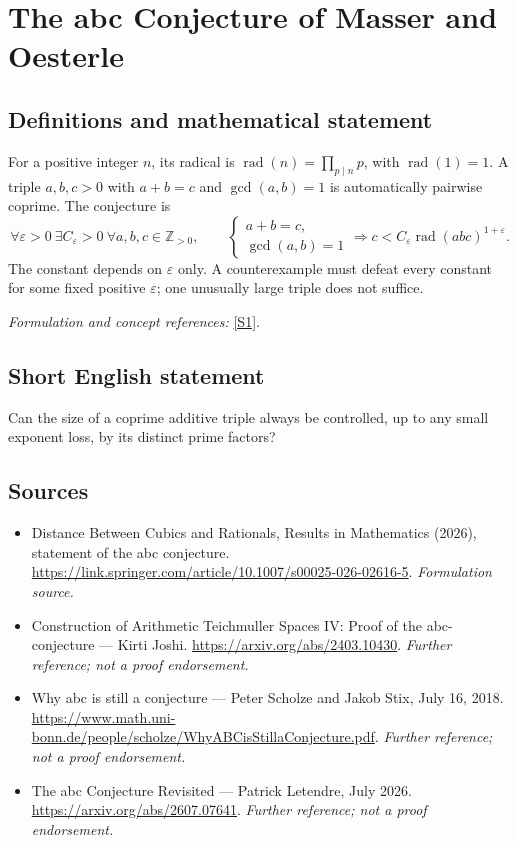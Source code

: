 \documentclass[11pt]{article}
\begin{document}
\section*{\texorpdfstring{The abc Conjecture of Masser and Oesterle}{The abc Conjecture of Masser and Oesterle}}\label{11}
\subsection{Definitions and mathematical statement}
For a positive integer $n$, its radical is $\operatorname{rad}(n)=\prod_{p\mid n}p$, with $\operatorname{rad}(1)=1$. A triple $a,b,c>0$ with $a+b=c$ and $\gcd(a,b)=1$ is automatically pairwise coprime. The conjecture is
\[
 \forall\varepsilon>0\ \exists C_\varepsilon>0\ \forall a,b,c\in{\mathbb{Z}}_{>0},\qquad
 \begin{cases}a+b=c,\\\gcd(a,b)=1\end{cases}
 \Longrightarrow c<C_\varepsilon\operatorname{rad}(abc)^{1+\varepsilon}.
\]
The constant depends on $\varepsilon$ only. A counterexample must defeat every constant for some fixed positive $\varepsilon$; one unusually large triple does not suffice.
\par\smallskip\textit{Formulation and concept references:} \href{https://link.springer.com/article/10.1007/s00025-026-02616-5}{[S1]}.

\subsection{Short English statement}
Can the size of a coprime additive triple always be controlled, up to any small exponent loss, by its distinct prime factors?
\subsection{Sources}
\begin{itemize}
\item[S1]Distance Between Cubics and Rationals, Results in Mathematics (2026), statement of the abc conjecture.
\url{https://link.springer.com/article/10.1007/s00025-026-02616-5}.
\textit{Formulation source.}
\item[S2]Construction of Arithmetic Teichmuller Spaces IV: Proof of the abc-conjecture — Kirti Joshi.
\url{https://arxiv.org/abs/2403.10430}.
\textit{Further reference; not a proof endorsement.}
\item[S3]Why abc is still a conjecture — Peter Scholze and Jakob Stix, July 16, 2018.
\url{https://www.math.uni-bonn.de/people/scholze/WhyABCisStillaConjecture.pdf}.
\textit{Further reference; not a proof endorsement.}
\item[S4]The abc Conjecture Revisited — Patrick Letendre, July 2026.
\url{https://arxiv.org/abs/2607.07641}.
\textit{Further reference; not a proof endorsement.}
\end{itemize}
\end{document}
